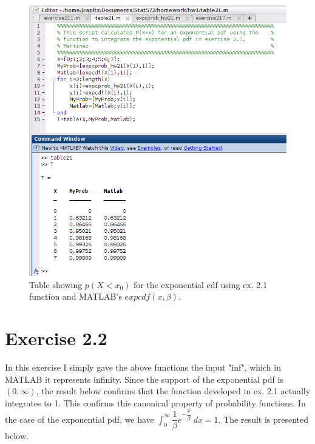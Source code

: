 \documentclass[12pt,a4paper]{article}
\begin{document}
\begin{figure}[ht!]
\includegraphics[scale=.70]{table21.png}
\caption{Table showing $p(X<x_0)$ for the exponential cdf using ex. 2.1 function and MATLAB's $expcdf(x,\beta)$.}
\label{fig2:2.1}
\end{figure}

\FloatBarrier

\section*{Exercise 2.2}

In this exercise I simply gave the above functions the input "inf", which in MATLAB it represents infinity. Since the support of the exponential pdf is $(0,\infty)$, the result below confirms that the function developed in ex. 2.1 actually integrates to 1. This confirms this canonical property of probability functions. In the case of the exponential pdf, we have $\displaystyle \int_0^\infty \dfrac{1}{\beta} e^{-\dfrac{x}{\beta}} \ dx=1$. The result is presented below.
\end{document}
